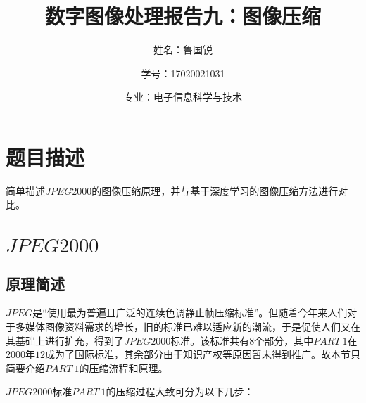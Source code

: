 \documentclass[UTF8]{ctexart}
\title{数字图像处理报告九：图像压缩}
\author{姓名：鲁国锐 \protect\newline
\and 学号：17020021031 \\
\and 专业：电子信息科学与技术}
\begin{document}
	\maketitle
	\renewcommand{\contentsname}{目录}
	\renewcommand{\listfigurename}{插图目录}
	\renewcommand{\listtablename}{表格目录}
	\renewcommand{\refname}{参考文献}
	\renewcommand{\abstractname}{摘要}
	\renewcommand{\indexname}{索引}
	\renewcommand{\tablename}{表}
	\renewcommand{\figurename}{图}
	
	
	
	\tableofcontents
	\newpage
	
	\hypersetup{
	bookmarks=true,
	colorlinks=true,
	linkcolor=red,
	urlcolor=blue
	}
    
    
	\section{题目描述}
	\indent 简单描述$JPEG2000$的图像压缩原理，并与基于深度学习的图像压缩方法进行对比。

			
    \section{$JPEG2000$}
        
        \subsection{原理简述}
    
        \indent $JPEG$是“使用最为普遍且广泛的连续色调静止帧压缩标准”\cite{digit_image_Gonzalez}。但随着今年来人们对于多媒体图像资料需求的增长，旧的标准已难以适应新的潮流，于是促使人们又在其基础上进行扩充，得到了$JPEG2000$标准。该标准共有$8$个部分，其中$PART\ 1$在$2000$年$12$成为了国际标准，其余部分由于知识产权等原因暂未得到推广。故本节只简要介绍$PART\ 1$的压缩流程和原理。
        
        \indent $JPEG2000$标准$PART\ 1$的压缩过程大致可分为以下几步\cite{liufangmin2002JPEG2000}：
        
\end{document}
